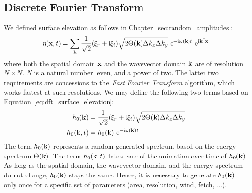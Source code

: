 \subsection{Discrete Fourier Transform}
We defined surface elevation as follows in Chapter~\ref{sec:random_amplitudes}:
\begin{equation}
\label{eq:dft_surface_elevation}
\eta(\mathbf{x}, t) = 
\sum_{\mathbf{k}}\frac{1}{\sqrt{2}}(\xi_r+\mathrm{i}\xi_i)
\sqrt{2\Theta(\mathbf{k})\Delta k_x \Delta k_y} 
~\mathrm{e}^{-\mathrm{i}\omega(\mathbf{k})t}
~\mathrm{e}^{\mathrm{i}\mathbf{k}^{\mathsf{T}}\mathbf{x}}
\end{equation}
where both the spatial domain $\mathbf{x}$ and the wavevector domain $\mathbf{k}$ are
of resolution $N \times N$. $N$ is a natural number, even, and a power of two.
The latter two requirements are concessions to the~\emph{Fast Fourier Transform}
algorithm, which works fastest at such resolutions. We may define the following
two terms based on Equation~\ref{eq:dft_surface_elevation}:
\begin{align}
\label{eq:dft_h0}
h_0(\mathbf{k})   &= \frac{1}{\sqrt{2}}(\xi_r+\mathrm{i}\xi_i)\sqrt{2\Theta(\mathbf{k})\Delta k_x \Delta k_y} \\
h_0(\mathbf{k},t) &= h_0(\mathbf{k})~\mathrm{e}^{-\mathrm{i}\omega(\mathbf{k})t}
\end{align}
The term $h_0(\mathbf{k})$ represents a random generated spectrum based on the energy
spectrum $\Theta(\mathbf{k})$. The term $h_0(\mathbf{k},t)$ takes care of the
animation over time of $h_0(\mathbf{k})$. As long as the spatial domain,
the wavevector domain, and the energy spectrum do not change, $h_0(\mathbf{k})$
stays the same. Hence, it is necessary to generate $h_0(\mathbf{k})$ only once
for a specific set of parameters (area, resolution, wind, fetch, ...).
%
